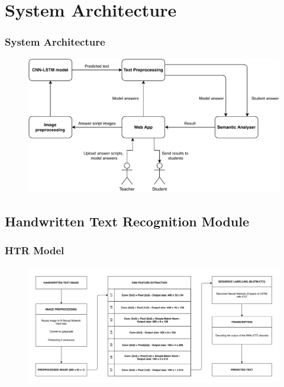 \section{System Architecture}
\begin{frame}
    \frametitle{System Architecture}
    \begin{figure}[!h]
        \centering
        \includegraphics[scale=0.6]{images/arch.pdf}
    \end{figure}
\end{frame}


\subsection{Handwritten Text Recognition Module}
\begin{frame}
    \frametitle{HTR Model}
    \begin{figure}[!h]
        \centering
        \includegraphics[scale=0.35]{images/htr.png}
    \end{figure}
\end{frame}


